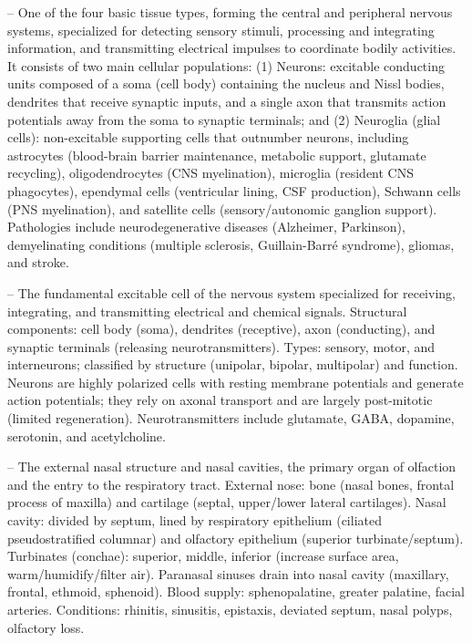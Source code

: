 -- One of the four basic tissue types, forming the central and peripheral nervous systems, specialized for detecting sensory stimuli, processing and integrating information, and transmitting electrical impulses to coordinate bodily activities. It consists of two main cellular populations: (1) Neurons: excitable conducting units composed of a soma (cell body) containing the nucleus and Nissl bodies, dendrites that receive synaptic inputs, and a single axon that transmits action potentials away from the soma to synaptic terminals; and (2) Neuroglia (glial cells): non-excitable supporting cells that outnumber neurons, including astrocytes (blood-brain barrier maintenance, metabolic support, glutamate recycling), oligodendrocytes (CNS myelination), microglia (resident CNS phagocytes), ependymal cells (ventricular lining, CSF production), Schwann cells (PNS myelination), and satellite cells (sensory/autonomic ganglion support). Pathologies include neurodegenerative diseases (Alzheimer, Parkinson), demyelinating conditions (multiple sclerosis, Guillain-Barré syndrome), gliomas, and stroke.

-- The fundamental excitable cell of the nervous system specialized for receiving, integrating, and transmitting electrical and chemical signals. Structural components: cell body (soma), dendrites (receptive), axon (conducting), and synaptic terminals (releasing neurotransmitters). Types: sensory, motor, and interneurons; classified by structure (unipolar, bipolar, multipolar) and function. Neurons are highly polarized cells with resting membrane potentials and generate action potentials; they rely on axonal transport and are largely post-mitotic (limited regeneration). Neurotransmitters include glutamate, GABA, dopamine, serotonin, and acetylcholine.

-- The external nasal structure and nasal cavities, the primary organ of olfaction and the entry to the respiratory tract. External nose: bone (nasal bones, frontal process of maxilla) and cartilage (septal, upper/lower lateral cartilages). Nasal cavity: divided by septum, lined by respiratory epithelium (ciliated pseudostratified columnar) and olfactory epithelium (superior turbinate/septum). Turbinates (conchae): superior, middle, inferior (increase surface area, warm/humidify/filter air). Paranasal sinuses drain into nasal cavity (maxillary, frontal, ethmoid, sphenoid). Blood supply: sphenopalatine, greater palatine, facial arteries. Conditions: rhinitis, sinusitis, epistaxis, deviated septum, nasal polyps, olfactory loss.

